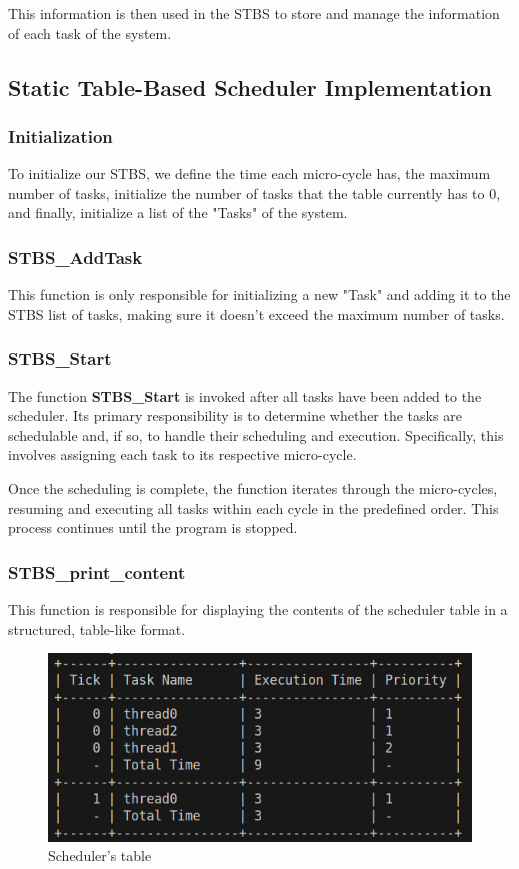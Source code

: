 \documentclass[a4paper,12pt]{article}
\begin{document}
This information is then used in the STBS to store and manage the information of each task of the system.

\subsection{Static Table-Based Scheduler Implementation}
\subsubsection{Initialization}
To initialize our STBS, we define the time each micro-cycle has, the maximum number of tasks, initialize the number of tasks that the table currently has to 0, and finally, initialize a list of the "Tasks" of the system.

\subsubsection{STBS\_AddTask}
This function is only responsible for initializing a new "Task" and adding it to the STBS list of tasks, making sure it doesn't exceed the maximum number of tasks.

\subsubsection{STBS\_Start}
The function \textbf{STBS\_Start} is invoked after all tasks have been added to the scheduler. Its primary responsibility is to determine whether the tasks are schedulable and, if so, to handle their scheduling and execution. Specifically, this involves assigning each task to its respective micro-cycle. 

Once the scheduling is complete, the function iterates through the micro-cycles, resuming and executing all tasks within each cycle in the predefined order. This process continues until the program is stopped.

\subsubsection{STBS\_print\_content}
This function is responsible for displaying the contents of the scheduler table in a structured, table-like format.

\begin{figure}[H]
    \centering
    \includegraphics[width=0.91\linewidth]{STBS_table.png}
    \caption{Scheduler's table}
    \label{fig:scheduler_table}
\end{figure}
\end{document}
